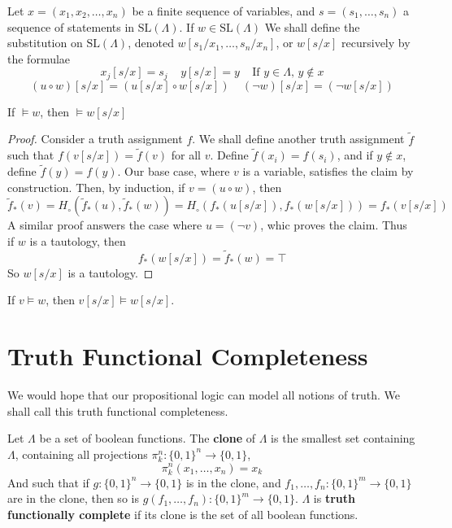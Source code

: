 \begin{definition}
    Let $x = (x_1, x_2, \dots, x_n)$ be a finite sequence of variables, and $s = (s_1, \dots, s_n)$ a sequence of statements in $\text{SL}(\Lambda)$. If $w \in \text{SL}(\Lambda)$ We shall define the substitution on $\text{SL}(\Lambda)$, denoted $w[s_1/x_1, \dots, s_n/x_n]$, or $w[s/x]$ recursively by the formulae
    \[ x_j[s/x] = s_j\ \ \ \ \ y [s/x] = y\ \ \ \ \  \text{If $y \in \Lambda$, $y \not \in x$} \]
    \[ (u \circ w)[s/x] = (u[s/x] \circ w[s/x])\ \ \ \ \ (\neg w)[s/x] = (\neg w[s/x]) \]
\end{definition}

\begin{theorem}
    If $\vDash w$, then $\vDash w[s/x]$
\end{theorem}
\begin{proof}
    Consider a truth assignment $f$. We shall define another truth assignment $\tilde{f}$ such that $f(v[s/x]) = \tilde{f}(v)$ for all $v$. Define $\tilde{f}(x_i) = f(s_i)$, and if $y \not \in x$, define $\tilde{f}(y) = f(y)$. Our base case, where $v$ is a variable, satisfies the claim by construction. Then, by induction, if $v = (u \circ w)$, then
    \[ \tilde{f}_*(v) = H_\circ(\tilde{f}_*(u), \tilde{f}_*(w)) = H_\circ(f_*(u[s/x]), f_*(w[s/x])) = f_*(v[s/x]) \]
    A similar proof answers the case where $u = (\neg v)$, whic proves the claim. Thus if $w$ is a tautology, then
    \[ f_*(w[s/x]) = \tilde{f}_*(w) = \top \]
    So $w[s/x]$ is a tautology.
\end{proof}

\begin{corollary}
    If $v \vDash w$, then $v[s/x] \vDash w[s/x]$.
\end{corollary}

\section{Truth Functional Completeness}

We would hope that our propositional logic can model all notions of truth. We shall call this truth functional completeness.

\begin{definition}
    Let $\Lambda$ be a set of boolean functions. The {\bf clone} of $\Lambda$ is the smallest set containing $\Lambda$, containing all projections $\pi^n_k : \{ 0, 1 \}^n \to \{ 0, 1 \}$,
    \[ \pi^n_k(x_1, \dots, x_n) = x_k \]
    And such that if $g: \{ 0, 1 \}^n \to \{ 0, 1 \}$ is in the clone, and $f_1, \dots, f_n : \{ 0, 1 \}^m \to \{ 0, 1 \}$ are in the clone, then so is $g(f_1, \dots, f_n): \{ 0, 1 \}^m \to \{ 0, 1 \}$. $\Lambda$ is {\bf truth functionally complete} if its clone is the set of all boolean functions.
\end{definition}

